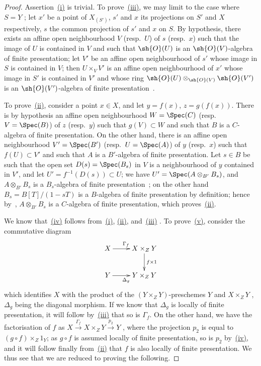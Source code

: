 \begin{proof}
Assertion~\hyperref[IV.1.4.3]{(i)} is trivial.
To prove~\hyperref[IV.1.4.3]{(iii)}, we may limit to the case where $S=Y$ ; let $x'$ be a point of $X_{(S')}$, $s'$ and $x$ its projections on $S'$ and $X$ respectively, $s$ the common projection of $s'$ and $x$ on $S$.
By hypothesis, there exists an affine open neighbourhood $V$ (resp.~$U$) of $s$ (resp.~$x$) such that the image of $U$ is contained in $V$ and such that $\sh{O}(U)$ is an $\sh{O}(V)$-algebra of finite presentation; let $V'$ be an affine open neighbourhood of $s'$ whose image in $S$ is contained in $V$; then $U\times_V V'$ is an affine open neighbourhood of $x'$ whose image in $S'$ is contained in $V'$ and whose ring $\sh{O}(U)\otimes_{\sh{O}(V)}\sh{O}(V')$ is an $\sh{O}(V')$-algebra of finite presentation~.

To prove~\hyperref[IV.1.4.3]{(ii)}, consider a point $x\in X$, and let $y=f(x)$, $z=g(f(x))$.
There is by hypothesis an affine open neighbourhood $W=\Spec(C)$ (resp.~$V=\Spec(B)$) of $z$ (resp.~$y$) such that $g(V)\subset W$ and such that $B$ is a $C$-algebra of finite presentation.
On the other hand, there is an affine open neighbourhood $V'=\Spec(B')$ (resp.~$U=\Spec(A)$) of $y$ (resp.~$x$) such that $f(U)\subset V'$ and such that $A$ is a $B'$-algebra of finite presentation.
Let $s\in B$ be such that the open set $D(s)=\Spec(B_s)$ in $V$ is a neighbourhood of $y$ contained in $V'$, and let $U'=f^{-1}(D(s))\subset U$; we have $U'=\Spec(A\otimes_{B'}B_s)$, and $A\otimes_{B'}B_s$ is a $B_s$-algebra of finite presentation~; on the other hand $B_s=B[T]/(1-sT)$ is a $B$-algebra of finite presentation by definition; hence by~, $A\otimes_{B'}B_s$ is a $C$-algebra of finite presentation, which proves~\hyperref[IV.1.4.3]{(ii)}.

We know that~\hyperref[IV.1.4.3]{(iv)} follows from~\hyperref[IV.1.4.3]{(i)}, \hyperref[IV.1.4.3]{(ii)}, and~\hyperref[IV.1.4.3]{(iii)} .
To prove~\hyperref[IV.1.4.3]{(v)}, consider the commutative diagram
\[
\xymatrix{
  X \ar[r]^{\Gamma_f} & X\times_Z Y \ar[d]^{f\times 1} \\
  Y \ar[r]_{\Delta_g} & Y\times_Z Y
}
\]
which identifies $X$ with the product of the $(Y\times_Z Y)$-preschemes $Y$ and $X\times_Z Y$ , $\Delta_g$ being the diagonal morphism.
If we know that $\Delta_g$ is locally of finite presentation, it will follow by~\hyperref[IV.1.4.3]{(iii)} that so is $\Gamma_f$.
On the other hand, we have the factorisation of $f$ as $X\xrightarrow{\Gamma_f} X\times_Z Y\xrightarrow{p_2} Y$ , where the projection $p_2$ is equal to $(g\circ f)\times_Z 1_Y$; as $g\circ f$ is assumed locally of finite presentation, so is $p_2$ by~\hyperref[IV.1.4.3]{(iv)}, and it will follow finally from~\hyperref[IV.1.4.3]{(ii)} that $f$ is also locally of finite presentation.
We thus see that we are reduced to proving the following.
\end{proof}

